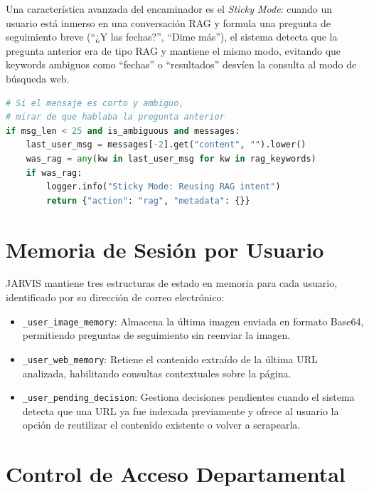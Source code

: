 Una característica avanzada del encaminador es el \textit{Sticky Mode}: cuando un usuario está inmerso en una conversación RAG y formula una pregunta de seguimiento breve (``¿Y las fechas?'', ``Dime más''), el sistema detecta que la pregunta anterior era de tipo RAG y mantiene el mismo modo, evitando que keywords ambiguos como ``fechas'' o ``resultados'' desvíen la consulta al modo de búsqueda web.

\begin{lstlisting}[language=Python, caption={Implementación del Sticky Mode.}]
# Si el mensaje es corto y ambiguo,
# mirar de que hablaba la pregunta anterior
if msg_len < 25 and is_ambiguous and messages:
    last_user_msg = messages[-2].get("content", "").lower()
    was_rag = any(kw in last_user_msg for kw in rag_keywords)
    if was_rag:
        logger.info("Sticky Mode: Reusing RAG intent")
        return {"action": "rag", "metadata": {}}
\end{lstlisting}

\section{Memoria de Sesión por Usuario}
\label{anexo:memoria-sesion}

JARVIS mantiene tres estructuras de estado en memoria para cada usuario, identificado por su dirección de correo electrónico:

\begin{itemize}
    \item \texttt{\_user\_image\_memory}: Almacena la última imagen enviada en formato Base64, permitiendo preguntas de seguimiento sin reenviar la imagen.
    \item \texttt{\_user\_web\_memory}: Retiene el contenido extraído de la última URL analizada, habilitando consultas contextuales sobre la página.
    \item \texttt{\_user\_pending\_decision}: Gestiona decisiones pendientes cuando el sistema detecta que una URL ya fue indexada previamente y ofrece al usuario la opción de reutilizar el contenido existente o volver a scrapearla.
\end{itemize}

\section{Control de Acceso Departamental}
\label{anexo:control-acceso}

